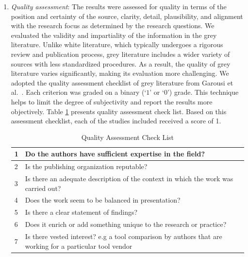 \begin{enumerate}
\item \emph{Quality assessment}: The results were assessed for quality in terms of the position and certainty of the source, clarity, detail, plausibility, and alignment with the research focus as determined by the research questions. We evaluated the validity and impartiality of the information in the grey literature. Unlike white literature, which typically undergoes a rigorous review and publication process, grey literature includes a wider variety of sources with less standardized procedures. As a result, the quality of grey literature varies significantly, making its evaluation more challenging. We adopted the quality assessment checklist of grey literature from Garousi et al.~\cite{GAROUSI2019101}.
Each criterion was graded on a binary (`$1$' or `$0$') grade.
This technique helps to limit the degree of subjectivity and report the results more objectively. Table \ref{tab:QualityGL} presents quality assessment check list.  Based on this assessment checklist, each of the studies included received a score of 1.

\begin{table}[h!]
\centering
\begin{tabular}{|l|l|}
    \hline
    1 & Do the authors have sufficient expertise in the field?  \\ \hline
    2 & Is the publishing organization reputable? \\ \hline
    3 & Is there an adequate description of the context in which the work was carried out?\\ \hline
    4 & Does the work seem to be balanced in presentation? \\ \hline
    5 & Is there a clear statement of findings? \\ \hline
 6 & Does it enrich or add something unique to the research or practice? \\ \hline
 7 & Is there vested interest? e.g a tool comparison by authors that are working for a particular tool vendor \\ \hline
    \end{tabular}

\caption{Quality Assessment Check List}
  \label{tab:QualityGL}
\end{table}



\end{enumerate}
